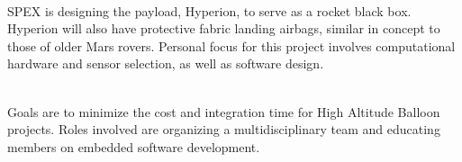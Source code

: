 \documentclass[]{deedy-resume-openfont}
\begin{document}
\descript{}\hfill \location{}\\
SPEX is designing the payload, Hyperion, to serve as a rocket black box. Hyperion will also have protective
fabric landing airbags, similar in concept to those of older Mars rovers. Personal focus for this project involves
computational hardware and sensor selection, as well as software design.

\bigbreak
{}
\descript{}\hfill \location{}\\
Goals are to minimize the cost and integration time for High Altitude Balloon projects.  Roles involved are organizing
a multidisciplinary team and educating members on embedded software development.
\ 
\end{document}
